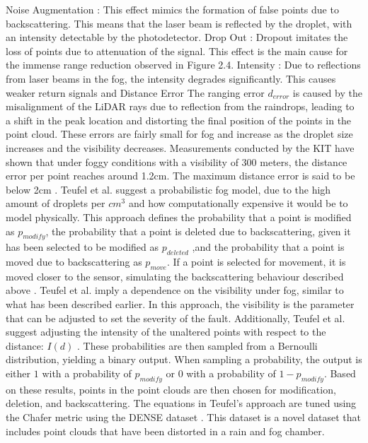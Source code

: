 Noise Augmentation \cite{teufel_enhancing_2023}: 
This effect mimics the formation of false points due to backscattering. This means that the laser beam is reflected by the droplet, with an intensity detectable by the photodetector. 
Drop Out \cite{teufel_enhancing_2023}: 
Dropout imitates the loss of points due to attenuation of the signal. This effect is the main cause for the immense range reduction observed in Figure 2.4. 
Intensity \cite{teufel_enhancing_2023}: 
Due to reflections from laser beams in the fog, the intensity degrades significantly. This causes weaker return signals and 
Distance Error \cite{heinzler_weather_2019}
 The ranging error $d_{error}$ is caused by the misalignment of the LiDAR rays due to reflection from the raindrops, leading to a shift in the peak location and distorting the final position of the points in the point cloud. These errors are fairly small for fog and increase as the droplet size increases and the visibility decreases. 
Measurements conducted by the KIT have shown that under foggy conditions with a visibility of 300 meters, the distance error per point reaches around 1.2cm. The maximum distance error is said to be below 2cm \cite{haider_methodology_2023}.
Teufel et al. suggest a probabilistic fog model, due to the high amount of droplets per $cm^3$ and how computationally expensive it would be to model physically. 
This approach defines the probability that a point is modified as $p_{modify}$, the probability that a point is deleted due to backscattering, given it has been selected to be modified as $p_{deleted}$ ,and the probability that a point is moved due to backscattering as $p_{move}$. If a point is selected for movement, it is moved closer to the sensor, simulating the backscattering behaviour described above \cite{teufel_simulating_2022}. Teufel et al. imply a dependence on the visibility under fog, similar to what has been described earlier. In this approach, the visibility is the parameter that can be adjusted to set the severity of the fault. 
Additionally, Teufel et al. suggest adjusting the intensity of the unaltered points with respect to the distance: $I(d)$ \cite{teufel_simulating_2022}. 
These probabilities are then sampled from a Bernoulli distribution, yielding a binary output. When sampling a probability, the output is either $1$ with a probability of $p_{modify}$ or 0 with a probability of $1-p_{modify}$. Based on these results, points in the point clouds are then chosen for modification, deletion, and backscattering. 
The equations in Teufel's approach are tuned using the Chafer metric using the DENSE dataset \cite{bijelic_seeing_2019}. This dataset is a novel dataset that includes point clouds that have been distorted in a rain and fog chamber. 

